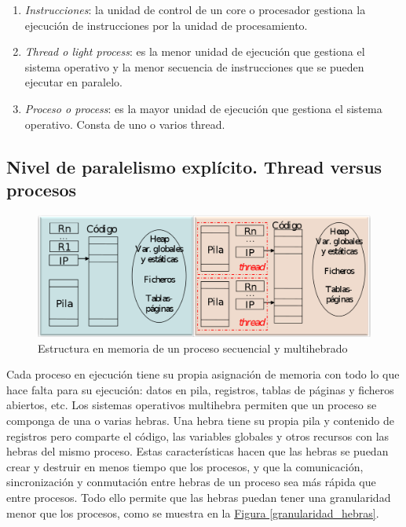 \documentclass[10pt,a4paper,spanish]{report}
\begin{document}
\begin{enumerate}[\color{azul}{\bf $\heartsuit$}]
    \item \textit{\textcolor[rgb]{0.2,0.4,0.8}{Instrucciones}}: la unidad de control de un core o procesador gestiona la ejecución de instrucciones por la unidad de procesamiento.
    \item \textit{\textcolor[rgb]{0.2,0.4,0.8}{Thread o light process}}: es la menor unidad de ejecución que gestiona el sistema operativo y la menor secuencia de instrucciones que se pueden ejecutar en paralelo.
    \item \textit{\textcolor[rgb]{0.2,0.4,0.8}{Proceso o process}}: es la mayor unidad de ejecución que gestiona el sistema operativo. Consta de uno o varios thread.
\end{enumerate}

\textcolor[rgb]{0.2,0.4,0.8}{\subsection{Nivel de paralelismo explícito. Thread versus procesos}}
\begin{figure}[!h]
\centering
\includegraphics[width=1\textwidth]{5}
\caption{Estructura en memoria de un proceso secuencial y multihebrado}
\label{processVSthread}
\end{figure}

Cada proceso en ejecución tiene su propia asignación de memoria con todo lo que hace falta para su ejecución: datos en pila, registros, tablas de páginas y ficheros abiertos, etc. Los sistemas operativos multihebra permiten que un proceso se componga de una o varias hebras. Una hebra tiene su propia pila y contenido de registros pero comparte el código, las variables globales y otros recursos con las hebras del mismo proceso. Estas características hacen que las hebras se puedan crear y destruir en menos tiempo que los procesos, y que la comunicación, sincronización y conmutación entre hebras de un proceso sea más rápida que entre procesos. Todo ello permite que las hebras puedan tener una granularidad menor que los procesos, como se muestra en la \hyperref[granularidad_hebras]{Figura \ref*{granularidad_hebras}}.
\end{document}
